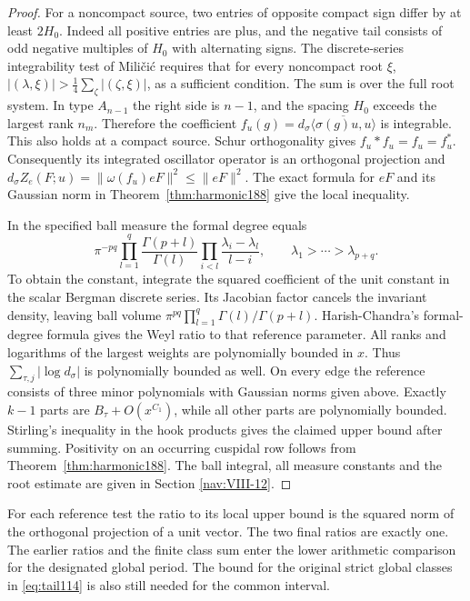 \documentclass[a4paper,11pt]{article}
\theoremstyle{definition}
\theoremstyle{remark}
\numberwithin{equation}{section}
\begin{document}
\begin{proof}
For a noncompact source, two entries of opposite compact
sign differ by at least \(2H_0\). Indeed all positive
entries are plus, and the negative tail consists of odd
negative multiples of \(H_0\) with alternating signs.
The discrete-series integrability test of Mili\v ci\'c
requires that for every noncompact root \(\xi\),
\(|(\lambda,\xi)|>\tfrac14\sum_{\zeta}|(\zeta,\xi)|\),
as a sufficient condition. The sum is over the full root
system. In type \(A_{n-1}\) the right side is \(n-1\),
and the spacing \(H_0\) exceeds the largest rank \(n_m\).
Therefore the coefficient
\(f_u(g)=d_\sigma\overline{\langle\sigma(g)u,u\rangle}\)
is integrable. This also holds at a compact source.
Schur orthogonality gives \(f_u*f_u=f_u=f_u^*\).
Consequently its integrated oscillator operator is an
orthogonal projection and
\(d_\sigma Z_e(F;u)=\|\omega(f_u)eF\|^2\le\|eF\|^2\).
The exact formula for \(eF\) and its Gaussian norm in
Theorem~\ref{thm:harmonic188} give the local inequality.

In the specified ball measure the formal degree equals
\[
 \pi^{-pq}\prod_{l=1}^q\frac{\Gamma(p+l)}{\Gamma(l)}
       \prod_{i<l}\frac{\lambda_i-\lambda_l}{l-i},
 \qquad \lambda_1>\cdots>\lambda_{p+q}.
\]
To obtain the constant, integrate the squared coefficient
of the unit constant in the scalar Bergman discrete series.
Its Jacobian factor cancels the invariant density, leaving
ball volume \(\pi^{pq}\prod_{l=1}^q\Gamma(l)/\Gamma(p+l)\).
Harish-Chandra's formal-degree formula gives the Weyl
ratio to that reference parameter. All ranks and logarithms
of the largest weights are polynomially bounded in \(x\).
Thus \(\sum_{\tau,j}|\log d_\sigma|\) is polynomially
bounded as well. On every edge the reference consists of
three minor polynomials with Gaussian norms given above.
Exactly \(k-1\) parts are \(B_\tau+O(x^{C_1})\), while all
other parts are polynomially bounded. Stirling's inequality
in the hook products gives the claimed upper bound after
summing. Positivity on an occurring cuspidal row follows from
Theorem~\ref{thm:harmonic188}. The ball integral, all measure
constants and the root estimate are given in
Section \ref{nav:VIII-12}.
\end{proof}

For each reference test the ratio to its local upper bound is
the squared norm of the orthogonal projection of a unit vector.
The two final ratios are exactly one. The earlier ratios and
the finite class sum enter the lower arithmetic comparison for
the designated global period. The bound for the original
strict global classes in \eqref{eq:tail114} is also still
needed for the common interval.
\end{document}
